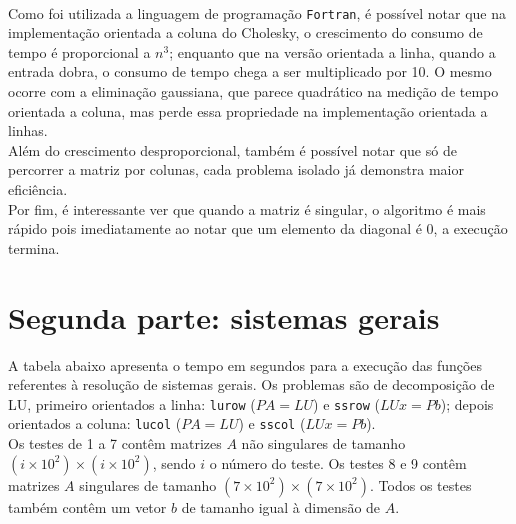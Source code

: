 \documentclass[a4paper,11pt]{article}
\newcommand\tab[1][.5cm]{\hspace*{#1}}
\begin{document}
\\
Como foi utilizada a linguagem de programação \texttt{Fortran}, é possível notar que na implementação orientada a coluna do Cholesky, o crescimento do consumo de tempo é proporcional a $n^3$; enquanto que na versão orientada a linha, quando a entrada dobra, o consumo de tempo chega a ser multiplicado por 10. O mesmo ocorre com a eliminação gaussiana, que parece quadrático na medição de tempo orientada a coluna, mas perde essa propriedade na implementação orientada a linhas. \\ 
\tab Além do crescimento desproporcional, também é possível notar que só de percorrer a matriz por colunas, cada problema isolado já demonstra maior eficiência. \\ 
\tab Por fim, é interessante ver que quando a matriz é singular, o algoritmo é mais rápido pois imediatamente ao notar que um elemento da diagonal é 0, a execução termina. \\


\section*{Segunda parte:  sistemas gerais}

\tab A tabela abaixo apresenta o tempo em segundos para a execução das funções referentes à resolução de sistemas gerais. Os problemas são de decomposição de LU, primeiro orientados a linha: \texttt{lurow} ($PA=LU$) e \texttt{ssrow} ($LUx=Pb$); depois orientados a coluna: \texttt{lucol} ($PA=LU$) e \texttt{sscol} ($LUx=Pb$).\\
\tab Os testes de 1 a 7 contêm matrizes $A$ não singulares de tamanho $(i \times 10^2) \times (i \times 10^2)$, sendo $i$ o número do teste. Os testes 8 e 9 contêm matrizes $A$ singulares de tamanho $(7 \times 10^2) \times (7 \times 10^2)$. Todos os testes também contêm um vetor $b$ de tamanho igual à dimensão de $A$. \\
\end{document}

